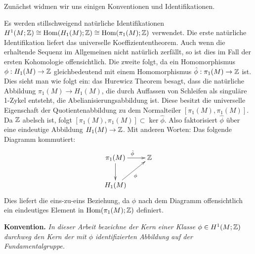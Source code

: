 	Zunächst widmen wir uns einigen Konventionen und Identifikationen.
	        \begin{bem}
            \label{bem:fundhomologie}
            Es werden stillschweigend natürliche Identifikationen $H^1(M;\mathbb{Z}) \cong \operatorname{Hom}(H_1(M);\mathbb{Z}) \cong \operatorname{Hom}(\pi_1(M);\mathbb{Z})$ verwendet. Die erste natürliche Identifikation liefert das universelle Koeffiziententheorem. Auch wenn die erhaltende Sequenz im Allgemeinen nicht natürlich zerfällt, so ist dies im Fall der ersten Kohomologie offensichtlich. Die zweite folgt, da ein Homomorphismus $\phi: H_1(M) \to \mathbb{Z}$ gleichbedeutend mit einem Homomorphismus $\hat\phi : \pi_1(M) \to \mathbb{Z}$ ist. Dies sieht man wie folgt ein: das Hurewicz Theorem besagt, dass die natürliche Abbildung $\pi_1(M) \to H_1(M)$, die durch Auffassen von Schleifen als singuläre 1-Zykel entsteht, die Abelianisierungsabbildung ist. Diese besitzt die universelle Eigenschaft der Quotientenabbildung zu dem Normalteiler $[\pi_1(M),\pi_1(M)]$. Da $\mathbb{Z}$ abelsch ist, folgt $[\pi_1(M),\pi_1(M)] \subset \ker \hat \phi$. Also faktorisiert $\hat \phi$ über eine eindeutige Abbildung $H_1(M) \to \mathbb{Z}$. Mit anderen Worten: Das folgende Diagramm kommutiert:
            \[
                \begin{xy}
                    \xymatrix{\pi_1(M)\ar[r]^{\hat \phi} \ar[d] & \ZZ \\
                                H_1(M)\ar[ru]_\phi}
                \end{xy}
            \]
            Dies liefert die eins-zu-eins Beziehung, da $\phi$ nach dem Diagramm offensichtlich ein eindeutiges Element in $\operatorname{Hom}(\pi_1(M);\mathbb{Z})$ definiert. \\ \par
            \noindent\textbf{Konvention.} \emph{In dieser Arbeit bezeichne der Kern einer Klasse $\phi \in H^1(M;\mathbb{Z})$ durchweg den Kern der mit $\phi$ identifizierten Abbildung auf der Fundamentalgruppe.}\\ \par
        \end{bem}
